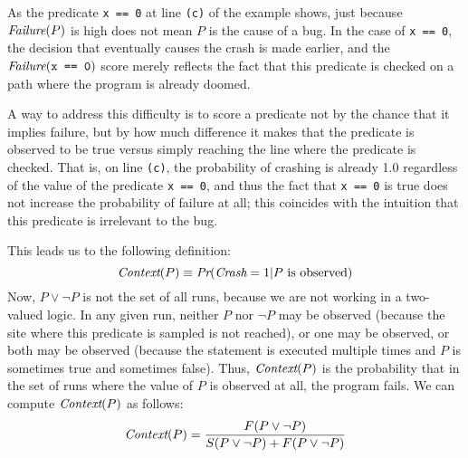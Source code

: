 As the predicate {\tt x == 0} at line {\tt (c)} of the example
shows, just because $\textit{Failure}(P)$ is high does not
mean $P$ is the cause of a bug.  In the case of {\tt x == 0}, the
decision that eventually causes the crash is made earlier, and the
$\textit{Failure}(\mbox{\tt x == 0})$ score merely reflects the fact that this
predicate is checked on a path where the program is already doomed.


A way to address this difficulty is to score a predicate not by the chance
that it implies failure, but by how much difference it makes that the predicate
is observed to be true versus simply reaching the line where the predicate is checked.
That is, on line {\tt (c)}, the probability of crashing is already 1.0 regardless
of the value of the predicate {\tt x == 0}, and thus the fact that {\tt x == 0} is
true does not increase the probability of failure at all; this coincides with
the intuition that this predicate is irrelevant to the bug.

This leads us to the following definition:
\[
\issue{modified by Alice}
\context(P) \equiv \prob(\fail = 1 | P \mbox{ is observed})  
\]
Now, $P \lor \lnot P$ is not the set of all runs, because we are not working in a two-valued logic.
In any given run, neither $P$ nor $\lnot P$ may be observed (because the site where this predicate is
sampled is not reached),
or one may be observed, or both may be observed (because the statement is executed
multiple times and $P$ is sometimes true and sometimes false).  Thus, $\textit{Context}(P)$ is the probability that
in the set of runs where the value of $P$ is observed at all, the program fails. We can compute $\textit{Context}(P)$ as follows:
\[ \textit{Context}(P) = \frac{F(P \lor \lnot P)}{S(P \lor \lnot P) + F(P \lor \lnot P)} \]

